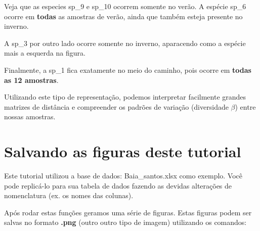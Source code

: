 \documentclass[
]{book}
\begin{document}
\begin{table}
\begin{tabular}{l|r|r|r|r|r|r|r|r|r|r|r|r|r}
\hline
\cellcolor[HTML]{e8867b}{\textcolor{black}{VERAO}} & \cellcolor[HTML]{e8867b}{\textcolor{black}{1}} & \cellcolor[HTML]{e8867b}{\textcolor{black}{0}} & \cellcolor[HTML]{e8867b}{\textcolor{black}{0}} & \cellcolor[HTML]{e8867b}{\textcolor{black}{0}} & \cellcolor[HTML]{e8867b}{\textcolor{black}{0}} & \cellcolor[HTML]{e8867b}{\textcolor{black}{7}} & \cellcolor[HTML]{e8867b}{\textcolor{black}{0}} & \cellcolor[HTML]{e8867b}{\textcolor{black}{0}} & \cellcolor[HTML]{e8867b}{\textcolor{black}{0}} & \cellcolor[HTML]{e8867b}{\textcolor{black}{1}} & \cellcolor[HTML]{e8867b}{\textcolor{black}{3}} & \cellcolor[HTML]{e8867b}{\textcolor{black}{1.588235}} & \cellcolor[HTML]{e8867b}{\textcolor{black}{0.5294118}}\\
\hline
\end{tabular}
\endgroup{}
\end{table}

Veja que as especies sp\_9 e sp\_10 ocorrem somente no verão. A espécie sp\_6 ocorre em \textbf{todas} as amostras de verão, ainda que também esteja presente no inverno.

A sp\_3 por outro lado ocorre somente no inverno, aparacendo como a espécie mais a esquerda na figura.

Finalmente, a sp\_1 fica exatamente no meio do caminho, pois ocorre em \textbf{todas as 12 amostras}.

Utilizando este tipo de representação, podemos interpretar facilmente grandes matrizes de distância e compreender os padrões de variação (diversidade \(\beta\)) entre nossas amostras.

\hypertarget{salvando-as-figuras-deste-tutorial}{%
\section{Salvando as figuras deste tutorial}\label{salvando-as-figuras-deste-tutorial}}

Este tutorial utilizou a base de dados: Baia\_santos.xlsx como exemplo. Você pode replicá-lo para sua tabela de dados fazendo as devidas alterações de nomenclatura (ex. os nomes das colunas).

Após rodar estas funções geramos uma série de figuras. Estas figuras podem ser salvas no formato \textbf{.png} (outro outro tipo de imagem) utilizando os comandos:
\end{document}
